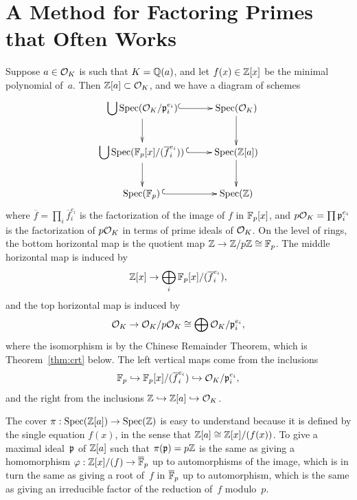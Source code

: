\section{A Method for Factoring Primes that Often Works}
Suppose $a\in\mathcal{O}_K$ is such that $K=\mathbb{Q}(a)$, and let
$f(x)\in\mathbb{Z}[x]$ be the minimal polynomial of~$a$.  Then
$\mathbb{Z}[a]\subset \mathcal{O}_K$, and we have a diagram of schemes
$$\xymatrix{
  {{\ds \bigcup}\Spec(\O_K/\p_i^{e_i})}\ar@{^(->}[r]\ar[d]               &{\Spec(\O_K)}\ar[d]  \\
{{\ds \bigcup}\Spec(\F_p[x]/(\overline{f}_i^{e_i}))\,}\ar@{^(->}[r] \ar[d]
         &{\Spec(\Z[a])}\ar[d] \\%
{\Spec(\F_p)\,}\ar@{^(->}[r]&{\Spec(\Z)}
}$$
where $\overline{f} = \prod_i \overline{f}_i^{e_i}$
is the factorization of the image of $f$ in $\mathbb{F}_p[x]$,
and $p\mathcal{O}_K = \prod \mathfrak{p}_i^{e_i}$ is the factorization
of $p\mathcal{O}_K$ in terms of prime ideals of $\mathcal{O}_K$.
On the level of rings, the bottom horizontal map
is the quotient map $\mathbb{Z}\to\mathbb{Z}/p\mathbb{Z}\cong \mathbb{F}_p$.
The middle horizontal map is induced by
$$
  \mathbb{Z}[x] \to \bigoplus_i \mathbb{F}_p[x]/(\overline{f}_i^{e_i}),
$$
and the top horizontal map is induced by
$$
  \mathcal{O}_K \to \mathcal{O}_K/p\mathcal{O}_K \cong \bigoplus \mathcal{O}_K/\mathfrak{p}_i^{e_i},
$$
where the isomorphism is by the Chinese Remainder Theorem,
which is Theorem~\ref{thm:crt} below.
The left vertical maps come from the inclusions
$$
   \mathbb{F}_p \hookrightarrow \mathbb{F}_p[x]/(\overline{f}_i^{e_i}) \hookrightarrow \mathcal{O}_K/\mathfrak{p}_i^{e_i},
$$
and the right from the inclusions $\mathbb{Z}\hookrightarrow\mathbb{Z}[a]\hookrightarrow\mathcal{O}_K$.

The cover $\pi:\operatorname{Spec}(\mathbb{Z}[a])\rightarrow \operatorname{Spec}(\mathbb{Z})$ is easy to understand
because it is defined by the single equation $f(x)$, in the sense
that $\mathbb{Z}[a]\cong \mathbb{Z}[x]/(f(x))$.  To give a
maximal ideal~$\mathfrak{p}$ of $\mathbb{Z}[a]$ such that $\pi(\mathfrak{p}) = p\mathbb{Z}$ is the
same as giving a homomorphism $\varphi:\mathbb{Z}[x]/(f) \rightarrow \overline{\mathbb{F}}_p$ up to
automorphisms of the image, which is in turn the same as giving a
root of~$f$ in $\overline{\mathbb{F}}_p$ up to automorphism, which is the same
as giving an irreducible factor of the reduction of~$f$ modulo~$p$.

